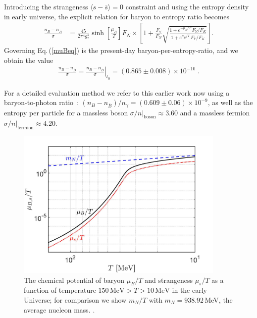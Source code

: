 Introducing the strangeness $\langle s-\bar s\rangle=0$ constraint and using the entropy density in early universe, the explicit relation for baryon to entropy ratio becomes
\begin{align}\label{muBeq}
\frac{n_B-n_{\overline{B}}}{\sigma}&=\frac{45}{2\pi^4g^s_\ast}\sinh\left[\frac{\mu_B}{T}\right]F_N\times\left[1+\frac{F_Y}{F_N}\sqrt{\frac{1+e^{-\mu_B/T}\,F_Y/F_K}{1+e^{\mu_B/T}\,F_Y/F_K}}\right].
\end{align}
Governing Eq.\,(\ref{muBeq}) is the present-day baryon-per-entropy-ratio, and we obtain the value 
\begin{align}\label{BdS}
\frac{n_B-n_{\overline{B}}}{\sigma}= \left.\frac{n_B-n_{\overline{B}}}{ \sigma}\right|_{t_0}=(0.865\pm0.008)\times10^{-10} \;.
\end{align}

For a detailed evaluation method we refer to this earlier work now using a baryon-to-photon ratio~\cite{ParticleDataGroup:2018ovx}: $\left(n_B-n_{\overline{B}}\right)/n_\gamma= (0.609\pm0.06)\times10^{-9}$, as well as the entropy per particle for a massless boson $\sigma/n|_\mathrm{boson}\approx 3.60$ and a massless fermion $\sigma/n|_\mathrm{fermion}\approx 4.20$. 

\begin{figure} 
\centerline{\includegraphics[width=0.9\textwidth]{./plots/New_Chemical_Potential_C.jpg}}
\caption{The chemical potential of baryon $\mu_B/T$ and strangeness $\mu_s/T$ as a function of temperature $150\,\mathrm{MeV}> T>10\,\mathrm{MeV}$ in the early Universe; for comparison we show $m_N/T $ with $m_N=938.92$\,MeV, the average nucleon mass. . }
\label{ChemPotFig} 
\end{figure}

